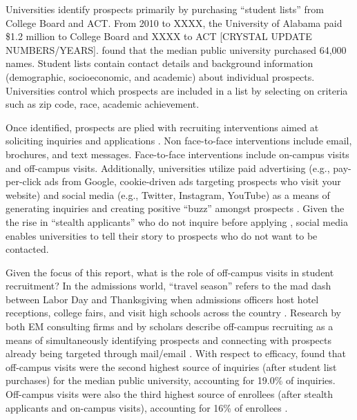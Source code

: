 \documentclass[twoside]{article}
\begin{document}


Universities identify prospects primarily by purchasing ``student lists'' from College Board and ACT. From 2010 to XXXX, the University of Alabama paid \$1.2 million to College Board and XXXX to ACT \citep{RN4035} [CRYSTAL UPDATE NUMBERS/YEARS].  \cite{RN4314} found that the median public university purchased 64,000 names. Student lists contain contact details and background information (demographic, socioeconomic, and academic) about individual prospects. Universities control which prospects are included in a list by selecting on criteria such as zip code, race, academic achievement.  

Once identified, prospects are plied with recruiting interventions aimed at soliciting inquiries and applications \citep{RN4323}. Non face-to-face interventions include email, brochures, and text messages.  Face-to-face interventions include on-campus visits and off-campus visits. Additionally, universities utilize paid advertising (e.g., pay-per-click ads from Google, cookie-driven ads targeting prospects who visit your website) and social media (e.g., Twitter, Instagram, YouTube) as a means of generating inquiries and creating positive ``buzz'' amongst prospects \citep{RN4134}. Given the the rise in ``stealth applicants'' who do not inquire before applying \citep{RN4411}, social media enables universities to tell their story to prospects who do not want to be contacted.

Given the focus of this report, what is the role of off-campus visits in student recruitment? In the admissions world, ``travel season'' refers to the mad dash between Labor Day and Thanksgiving when admissions officers host hotel receptions, college fairs, and visit high schools across the country \citep{RN3519}. Research by both EM consulting firms and by scholars describe off-campus recruiting as a means of simultaneously identifying prospects and connecting with prospects already being targeted through mail/email \citep[e.g., ][]{RN4323,RN4315,RN3519}. With respect to efficacy, \cite{RN4402} found that off-campus visits were the second highest source of inquiries (after student list purchases) for the median public university, accounting for 19.0\% of inquiries. Off-campus visits were also the third highest source of enrollees (after stealth applicants and on-campus visits), accounting for 16\% of enrollees \citep{RN4402}.
\end{document}

